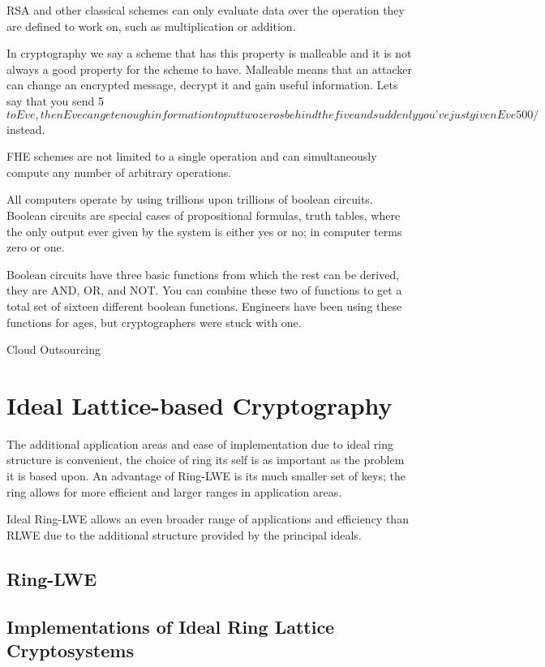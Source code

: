 RSA and other classical schemes can only evaluate data over the operation they are defined to work on, such as multiplication or addition. 

In cryptography we say a scheme that has this property is malleable and it is not always a good property for the scheme to have. Malleable means that an attacker can change an encrypted message, decrypt it and gain useful information. Lets say that you send 5$ to Eve, then Eve can get enough information to put two zeros behind the five and suddenly you’ve just given Eve 500/$ instead. 

\newline
FHE schemes are not limited to a single operation and can simultaneously compute any number of arbitrary operations. 

All computers operate by using trillions upon trillions of boolean circuits. Boolean circuits are special cases of propositional formulas, truth tables, where the only output ever given by the system is either yes or no; in computer terms zero or one. 

Boolean circuits have three basic functions from which the rest can be derived, they are AND, OR, and NOT. You can combine these two of functions to get a total set of sixteen different boolean functions. Engineers have been using these functions for ages, but cryptographers were stuck with one. 

Cloud Outsourcing 


\section{Ideal Lattice-based Cryptography}
The additional application areas and ease of implementation due to ideal ring structure is convenient, the choice of ring its self is as important as the problem it is based upon. An advantage of Ring-LWE is its much smaller set of keys; the ring allows for more efficient and larger ranges in application areas. 

Ideal Ring-LWE allows an even broader range of applications and efficiency than RLWE due to the additional structure provided by the principal ideals.

\subsection{Ring-LWE}

\subsection{Implementations of Ideal Ring Lattice Cryptosystems}


